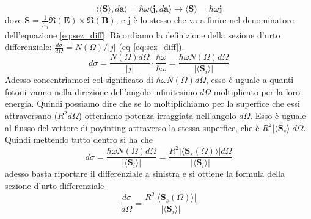 \documentclass[11pt,a4paper]{article}
\newcommand{\vettore}[1]{\mathbf{#1}}
\newcommand{\pscal}[2]{\langle #1,#2\rangle}
\begin{document}
		\begin{equation}
			\pscal{\langle\vettore S \rangle}{d\vettore{a}}=\hbar \omega \pscal{\vettore j}{d\vettore a}
			\rightarrow
			\langle\vettore S\rangle= \hbar \omega\vettore j
		\end{equation}
		dove $\vettore S=\frac{1}{\mu_0}\Re(\vettore E) \times \Re(\vettore B)$, e $\vettore j$ è lo stesso che va a finire nel denominatore dell'equazione \ref{eq:sez_diff}.\newline
		Ricordiamo la definizione della sezione d'urto differenziale: $\frac{d\sigma}{d\Omega}=N(\Omega)/|j|$ (eq \ref{eq:sez_diff}).
		\[
			d\sigma=\frac{N(\Omega)d\Omega}{|j|}\cdot\frac{\hbar\omega}{\hbar \omega}=
			\frac{\hbar \omega N(\Omega)d\Omega}{|\langle \vettore S_i\rangle|}
		\]
		Adesso concentriamoci col significato di $\hbar \omega N(\Omega)d\Omega$, esso è uguale a quanti fotoni vanno nella direzione dell'angolo infinitesimo $d\Omega$ moltiplicato per la loro energia.\newline
		Quindi possiamo dire che se lo moltiplichiamo per la superfice che essi attraversano ($R^2d\Omega $) otteniamo potenza irraggiata nell'angolo $d\Omega$.\newline
		Esso è uguale al flusso del vettore di poyinting attraverso la stessa superfice, che è $R^2|\langle \vettore {S}_s \rangle |d\Omega $. Quindi mettendo tutto dentro si ha che
		\[
			d\sigma=\frac{\hbar \omega N(\Omega)d\Omega}{|\langle \vettore S_i\rangle|}=
			\frac{R^2|\langle \vettore S_s(\Omega) \rangle |d\Omega}{|\langle \vettore S_i\rangle|}
		\]
		adesso basta riportare il differenziale a sinistra e si ottiene la formula della sezione d'urto differenziale
		\begin{equation}
			\frac{d\sigma}{d\Omega}=\frac{R^2|\langle \vettore S_s(\Omega) \rangle |}{|\langle \vettore S_i\rangle|}
		\end{equation}
\end{document}
